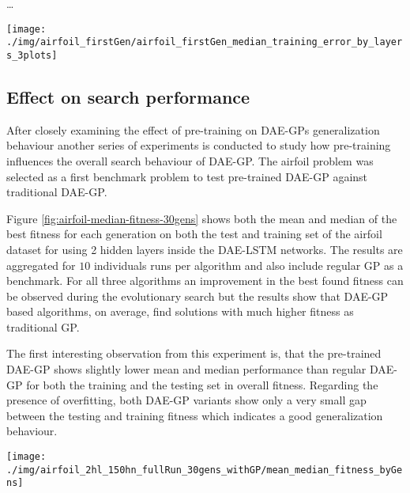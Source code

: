 \documentclass[
  11pt,
]{article}
\let\origfigure\figure
\let\endorigfigure\endfigure
\renewenvironment{figure}[1][2] {
    \expandafter\origfigure\expandafter[H]
} {
    \endorigfigure
}
\begin{document}
\ldots{}

\begin{figure}[c]

{\centering \texttt{[image: ./img/airfoil\_firstGen/airfoil\_firstGen\_median\_training\_error\_by\_layers\_3plots]} 

}

\caption{First Generation Median Training Error for variable number of hidden Layers}\label{fig:first-gen-airfoil-byLayers}
\end{figure}

\hypertarget{effect-on-search-performance}{%
\subsection{Effect on search performance}\label{effect-on-search-performance}}

After closely examining the effect of pre-training on DAE-GPs generalization behaviour another series of experiments is conducted to study how pre-training influences the overall search behaviour of DAE-GP. The airfoil problem was selected as a first benchmark problem to test pre-trained DAE-GP against traditional DAE-GP.

Figure \ref{fig:airfoil-median-fitness-30gens} shows both the mean and median of the best fitness for each generation on both the test and training set of the airfoil dataset for using 2 hidden layers inside the DAE-LSTM networks. The results are aggregated for \(10\) individuals runs per algorithm and also include regular GP as a benchmark. For all three algorithms an improvement in the best found fitness can be observed during the evolutionary search but the results show that DAE-GP based algorithms, on average, find solutions with much higher fitness as traditional GP.

The first interesting observation from this experiment is, that the pre-trained DAE-GP shows slightly lower mean and median performance than regular DAE-GP for both the training and the testing set in overall fitness. Regarding the presence of overfitting, both DAE-GP variants show only a very small gap between the testing and training fitness which indicates a good generalization behaviour.

\begin{figure}[c]

{\centering \texttt{[image: ./img/airfoil\_2hl\_150hn\_fullRun\_30gens\_withGP/mean\_median\_fitness\_byGens]} 

}

\caption{Best Fitness over 30 Generations - Airfoil (2HL)}\label{fig:airfoil-median-fitness-30gens}
\end{figure}
\end{document}
